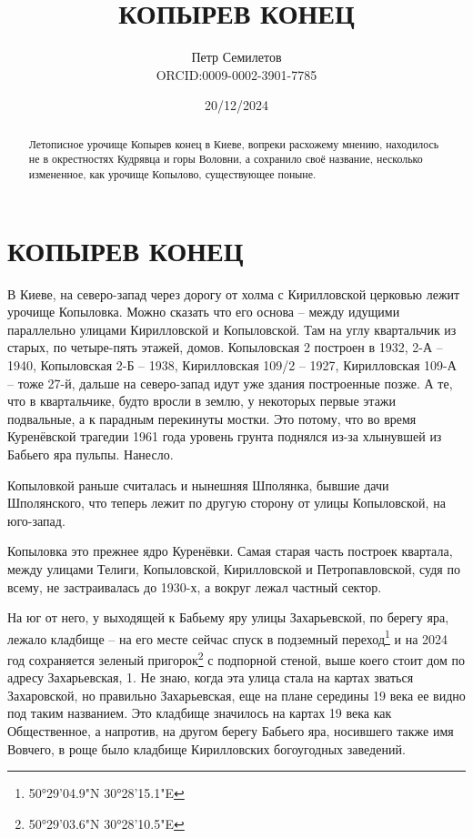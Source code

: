 \documentclass[a5paper,11pt,openany]{article}
\title{КОПЫРЕВ КОНЕЦ\\
\textsmaller[2]{редакция 1.0}}
\author{Петр Семилетов\\ORCID:0009-0002-3901-7785 \orcidlink{0009-0002-3901-7785}}
\date{20/12/2024}
\begin{document}
\maketitle

\pagestyle{empty}


\newpage

\pagestyle{plain}



%
%
%

\begin{abstract}
Летописное урочище Копырев конец в Киеве, вопреки расхожему мнению, находилось не в окрестностях Кудрявца и горы Воловни, а сохранило своё название, несколько измененное, как урочище Копылово, существующее поныне.
\end{abstract}


\section{КОПЫРЕВ КОНЕЦ}


В Киеве, на северо-запад через дорогу от холма с Кирилловской церковью лежит урочище Копыловка. Можно сказать что его основа – между идущими параллельно улицами Кирилловской и Копыловской. Там на углу квартальчик из старых, по четыре-пять этажей, домов. Копыловская 2 построен в 1932, 2-А – 1940, Копыловская 2-Б – 1938, Кирилловская 109/2 – 1927, Кирилловская 109-А – тоже 27-й, дальше на северо-запад идут уже здания построенные позже. А те, что в квартальчике, будто вросли в землю, у некоторых первые этажи подвальные, а к парадным перекинуты мостки. Это потому, что во время Куренёвской трагедии 1961 года уровень грунта поднялся из-за хлынувшей из Бабьего яра пульпы. Нанесло. 

Копыловкой раньше считалась и нынешняя Шполянка, бывшие дачи Шполянского, что теперь лежит по другую сторону от улицы Копыловской, на юго-запад.

Копыловка это прежнее ядро Куренёвки. 
Самая старая часть построек квартала, между улицами Телиги, Копыловской, Кирилловской и Петропавловской, судя по всему, не застраивалась до 1930-х, а вокруг лежал частный сектор.

На юг от него, у выходящей к Бабьему яру улицы Захарьевской, по берегу яра, лежало кладбище – на его месте сейчас спуск в подземный переход\footnote{50°29'04.9"N 30°28'15.1"E} и на 2024 год сохраняется зеленый пригорок\footnote{50°29'03.6"N 30°28'10.5"E} с подпорной стеной, выше коего стоит дом по адресу Захарьевская, 1. Не знаю, когда эта улица стала на картах зваться Захаровской, но правильно Захарьевская, еще на плане середины 19 века ее видно под таким названием. Это кладбище значилось на картах 19 века как Общественное, а напротив, на другом берегу Бабьего яра, носившего также имя Вовчего, в роще было кладбище Кирилловских богоугодных заведений.
\end{document}
